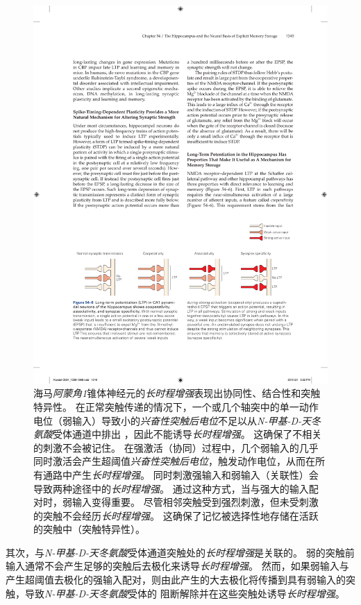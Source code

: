 \begin{figure}[htbp]
	\centering
	\includegraphics[width=0.9\linewidth]{chap54/fig_54_6}
	\caption{海马\textit{阿蒙角1}锥体神经元的\textit{长时程增强}表现出协同性、结合性和突触特异性。
		在正常突触传递的情况下，一个或几个轴突中的单一动作电位（弱输入）导致小的\textit{兴奋性突触后电位}不足以从\textit{N-甲基-D-天冬氨酸}受体通道中排出 ，因此不能诱导\textit{长时程增强}。
		这确保了不相关的刺激不会被记住。 在强激活（协同）过程中，几个弱输入的几乎同时激活会产生超阈值\textit{兴奋性突触后电位}，触发动作电位，从而在所有通路中产生\textit{长时程增强}。
		同时刺激强输入和弱输入（关联性）会导致两种途径中的\textit{长时程增强}。
		通过这种方式，当与强大的输入配对时，弱输入变得重要。
		尽管相邻突触受到强烈刺激，但未受刺激的突触不会经历\textit{长时程增强}。
		这确保了记忆被选择性地存储在活跃的突触中（突触特异性）。}
	\label{fig:54_6}
\end{figure}


其次，与\textit{N-甲基-D-天冬氨酸}受体通道突触处的\textit{长时程增强}是关联的。
弱的突触前输入通常不会产生足够的突触后去极化来诱导\textit{长时程增强}。
然而，如果弱输入与产生超阈值去极化的强输入配对，则由此产生的大去极化将传播到具有弱输入的突触，导致\textit{N-甲基-D-天冬氨酸}受体的  阻断解除并在这些突触处诱导\textit{长时程增强}。


